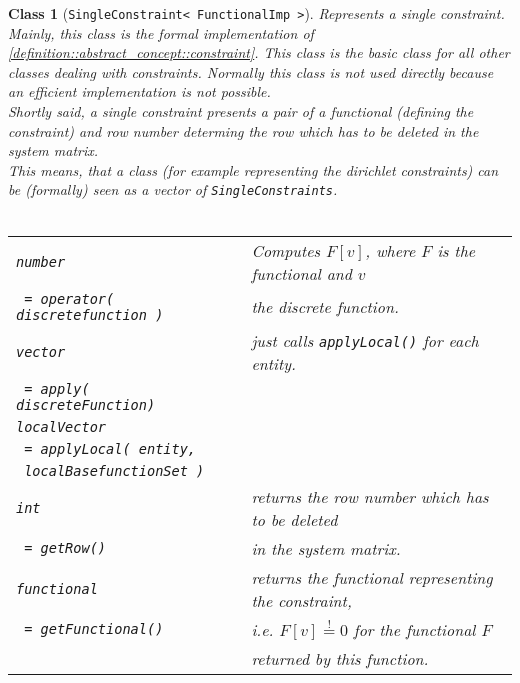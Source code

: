 \documentclass[a4paper,11pt]{article}
\numberwithin{equation}{section}
\newtheorem{class}[definition]{Class}
\newcommand{\theoremEndLine}{\hspace{1mm}}
\newcommand{\CodeT}[1]{\textnormal{\texttt{#1}}}
\begin{document}
	\begin{class}[\CodeT{SingleConstraint< FunctionalImp >}]
		Represents a single constraint. Mainly, this class is the formal implementation of \ref{definition::abstract_concept::constraint}. This class is the basic class for all other classes dealing with constraints. Normally this class is not used directly because an efficient implementation is not possible.\\
		Shortly said, a single constraint presents a pair of a \emph{functional} (defining the constraint) and \emph{row number} determing the row which has to be deleted in the system matrix.\\
		This means, that a class (for example representing the dirichlet constraints) can be (formally) seen as a vector of \CodeT{SingleConstraints}.
		\\\\
      \begin{tabular}{|l|l|}
        \hline
        \CodeT{number} & Computes $F[v]$, where $F$ is the functional and $v$\\
        \CodeT{ = operator( discretefunction )} & the discrete function.\\
        \hline
				\CodeT{vector} & just calls \CodeT{applyLocal()} for each entity.\\
				\CodeT{ = apply( discreteFunction) } & \\
				\hline
        \CodeT{localVector} & \\
        \CodeT{ = applyLocal( entity,} & \\
        \CodeT{ localBasefunctionSet )}  & \\
        \hline
				\CodeT{int} & returns the row number which has to be deleted \\
				\CodeT{ = getRow()} & in the system matrix.\\
        \hline
				\CodeT{functional} & returns the functional representing the constraint,\\
				\CodeT{ = getFunctional()} & i.e. $F[v]\stackrel{!}{=}0$ for the functional $F$\\
				  & returned by this function.\\
				\hline
      \end{tabular}
    \end{class}\theoremEndLine
\end{document}

